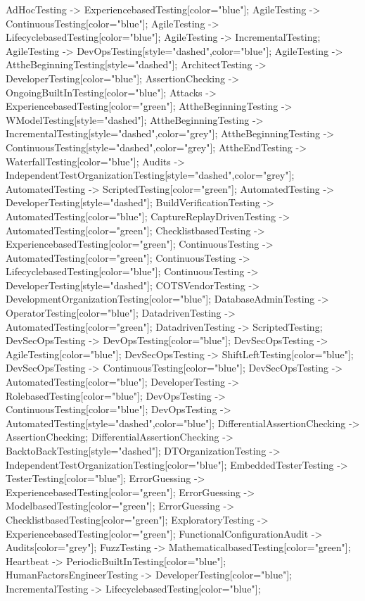 \documentclass{article}
\begin{document}
{AdHocTesting -> ExperiencebasedTesting[color="blue"];
AgileTesting -> ContinuousTesting[color="blue"];
AgileTesting -> LifecyclebasedTesting[color="blue"];
AgileTesting -> IncrementalTesting;
AgileTesting -> DevOpsTesting[style="dashed",color="blue"];
AgileTesting -> AttheBeginningTesting[style="dashed"];
ArchitectTesting -> DeveloperTesting[color="blue"];
AssertionChecking -> OngoingBuiltInTesting[color="blue"];
Attacks -> ExperiencebasedTesting[color="green"];
AttheBeginningTesting -> WModelTesting[style="dashed"];
AttheBeginningTesting -> IncrementalTesting[style="dashed",color="grey"];
AttheBeginningTesting -> ContinuousTesting[style="dashed",color="grey"];
AttheEndTesting -> WaterfallTesting[color="blue"];
Audits -> IndependentTestOrganizationTesting[style="dashed",color="grey"];
AutomatedTesting -> ScriptedTesting[color="green"];
AutomatedTesting -> DeveloperTesting[style="dashed"];
BuildVerificationTesting -> AutomatedTesting[color="blue"];
CaptureReplayDrivenTesting -> AutomatedTesting[color="green"];
ChecklistbasedTesting -> ExperiencebasedTesting[color="green"];
ContinuousTesting -> AutomatedTesting[color="green"];
ContinuousTesting -> LifecyclebasedTesting[color="blue"];
ContinuousTesting -> DeveloperTesting[style="dashed"];
COTSVendorTesting -> DevelopmentOrganizationTesting[color="blue"];
DatabaseAdminTesting -> OperatorTesting[color="blue"];
DatadrivenTesting -> AutomatedTesting[color="green"];
DatadrivenTesting -> ScriptedTesting;
DevSecOpsTesting -> DevOpsTesting[color="blue"];
DevSecOpsTesting -> AgileTesting[color="blue"];
DevSecOpsTesting -> ShiftLeftTesting[color="blue"];
DevSecOpsTesting -> ContinuousTesting[color="blue"];
DevSecOpsTesting -> AutomatedTesting[color="blue"];
DeveloperTesting -> RolebasedTesting[color="blue"];
DevOpsTesting -> ContinuousTesting[color="blue"];
DevOpsTesting -> AutomatedTesting[style="dashed",color="blue"];
DifferentialAssertionChecking -> AssertionChecking;
DifferentialAssertionChecking -> BacktoBackTesting[style="dashed"];
DTOrganizationTesting -> IndependentTestOrganizationTesting[color="blue"];
EmbeddedTesterTesting -> TesterTesting[color="blue"];
ErrorGuessing -> ExperiencebasedTesting[color="green"];
ErrorGuessing -> ModelbasedTesting[color="green"];
ErrorGuessing -> ChecklistbasedTesting[color="green"];
ExploratoryTesting -> ExperiencebasedTesting[color="green"];
FunctionalConfigurationAudit -> Audits[color="grey"];
FuzzTesting -> MathematicalbasedTesting[color="green"];
Heartbeat -> PeriodicBuiltInTesting[color="blue"];
HumanFactorsEngineerTesting -> DeveloperTesting[color="blue"];
IncrementalTesting -> LifecyclebasedTesting[color="blue"];
}
\end{document}
